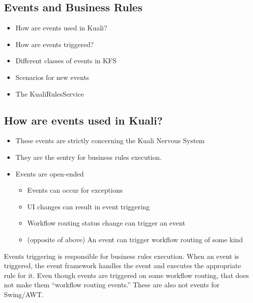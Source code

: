 \begin{ifhtml}
    \begin{s5slide}
        \section{Events and Business Rules}
        \begin{itemize}
          \item How are events used in Kuali?
          \item How are events triggered?
          \item Different classes of events in KFS
          \item Scenarios for new events
          \item The KualiRulesService
        \end{itemize}
        
        \begin{s5notes}
          
        \end{s5notes} 
    \end{s5slide}

    \begin{s5slide}
        \section{How are events used in Kuali?}
        \begin{itemize}
          \item These events are strictly concerning the Kuali Nervous System 
          \item They are the sentry for business rules execution.
          \item Events are open-ended 
            \begin{itemize}
            \item Events can occur for exceptions
            \item UI changes can result in event triggering
            \item Workflow routing status change can trigger an event
            \item (opposite of above) An event can trigger workflow routing of some kind
            \end{itemize}
        \end{itemize}
        
        \begin{s5notes}
          Events triggering is responsible for business rules execution. When an event is triggered, 
          the event framework handles the event and executes the appropriate rule for it. Even though events are triggered 
          on some workflow routing, that does not make them ``workflow routing events.'' These are also not events for Swing/AWT.
          

\end{s5notes}
\end{s5slide}
\end{ifhtml}
